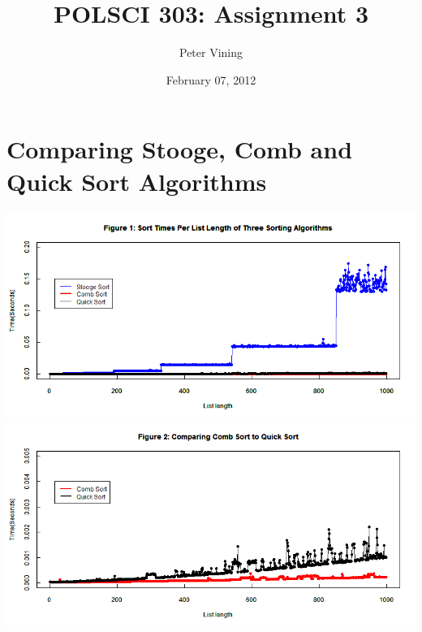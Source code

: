 \documentclass[10pt,letter]{article}
\begin{document}
\title{POLSCI 303: Assignment 3}

\author{Peter Vining}

\date{February 07, 2012}

\maketitle

\section*{Comparing Stooge, Comb and Quick Sort Algorithms}
\begin{center}
\includegraphics[scale=.5]{test.png}
\\
\includegraphics[scale=.5]{test2.png}
\end{center} 
\end{document}
